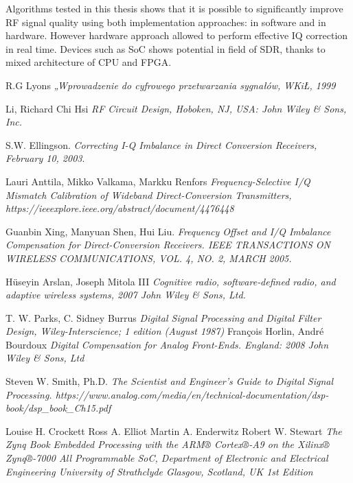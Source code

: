 \documentclass[en,printmode]{mgr}
\begin{document}
	Algorithms tested in this thesis shows that it is possible to significantly improve RF signal
	quality using both implementation approaches: in software and in hardware. However hardware
	approach allowed to perform effective IQ correction in real time. Devices such as SoC shows
	potential in field of SDR, thanks to mixed architecture of CPU and FPGA.



\begin{thebibliography}{9}
R.G Lyons
\textit{„Wprowadzenie do cyfrowego przetwarzania sygnałów, WKiŁ, 1999}

Li, Richard Chi Hsi
\textit{RF Circuit Design, Hoboken, NJ, USA: John Wiley \& Sons, Inc.}

S.W. Ellingson. 
\textit{Correcting I-Q Imbalance in Direct Conversion
Receivers, February 10, 2003}.

Lauri Anttila,
Mikko Valkama,
Markku Renfors
\textit{Frequency-Selective I/Q Mismatch Calibration of Wideband Direct-Conversion Transmitters, https://ieeexplore.ieee.org/abstract/document/4476448}

Guanbin Xing, Manyuan Shen, Hui Liu.
\textit{Frequency Offset and I/Q Imbalance Compensation for Direct-Conversion Receivers. IEEE TRANSACTIONS ON WIRELESS COMMUNICATIONS, VOL. 4, NO. 2, MARCH 2005.}

Hüseyin Arslan, Joseph Mitola III
\textit{Cognitive radio, software‐defined radio, and adaptive wireless systems, 2007 John Wiley \& Sons, Ltd.}

T. W. Parks,
C. Sidney Burrus
\textit{Digital Signal Processing and
Digital Filter Design, Wiley-Interscience; 1 edition (August 1987)}
François Horlin, André Bourdoux
\textit{Digital Compensation for
Analog Front-Ends. England: 2008 John Wiley \& Sons, Ltd}


Steven W. Smith, Ph.D.
\textit{The Scientist and Engineer's Guide to
Digital Signal Processing. https://www.analog.com/media/en/technical-documentation/dsp-book/dsp_book_Ch15.pdf}

Louise H. Crockett
Ross A. Elliot
Martin A. Enderwitz
Robert W. Stewart
\textit{The Zynq Book Embedded Processing with the ARM® Cortex®-A9 on the Xilinx®
Zynq®-7000 All Programmable SoC, Department of Electronic and Electrical Engineering
University of Strathclyde
Glasgow, Scotland, UK
1st Edition}


\end{thebibliography}
\end{document}
